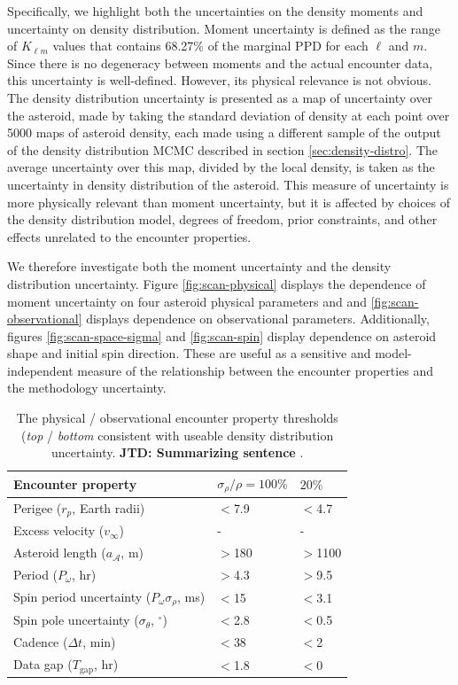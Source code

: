 \documentclass[fleqn,usenatbib]{mnras}
\newcommand{\jtd}[1]{ {\bf{\color{red} JTD: #1}} }
\begin{document}
Specifically, we highlight both the uncertainties on the density moments and uncertainty on density distribution. Moment uncertainty is defined as the range of $K_{\ell m}$ values that contains 68.27\% of the marginal PPD for each $\ell$ and $m$. Since there is no degeneracy between moments and the actual encounter data, this uncertainty is well-defined. However, its physical relevance is not obvious. The density distribution uncertainty is presented as a map of uncertainty over the asteroid, made by taking the standard deviation of density at each point over 5000 maps of asteroid density, each made using a different sample of the output of the density distribution MCMC described in section \ref{sec:density-distro}. The average uncertainty over this map, divided by the local density, is taken as the uncertainty in density distribution of the asteroid. This measure of uncertainty is more physically relevant than moment uncertainty, but it is affected by choices of the density distribution model, degrees of freedom, prior constraints, and other effects unrelated to the encounter properties.

We therefore investigate both the moment uncertainty and the density distribution uncertainty. Figure \ref{fig:scan-physical} displays the dependence of moment uncertainty on four asteroid physical parameters and and \ref{fig:scan-observational} displays dependence on observational parameters. Additionally, figures \ref{fig:scan-space-sigma} and \ref{fig:scan-spin} display dependence on asteroid shape and initial spin direction. These are useful as a sensitive and model-independent measure of the relationship between the encounter properties and the methodology uncertainty.


\begin{table}
  \centering
  \begin{tabular}{lll} \hline
    Encounter property & $\sigma_\rho / \rho = 100\%$ & $20\%$ \\ \hline
    Perigee ($r_p$, Earth radii) & $<$7.9 & $<$4.7 \\
    Excess velocity ($v_\infty$) & - & - \\
    Asteroid length ($a_\mathcal{A}$, m) & $>$180 & $>$1100 \\
    Period ($P_\omega$, hr) & $>$4.3 & $>$9.5\\ \hline
    Spin period uncertainty ($P_\omega \sigma_\rho$, ms) & $<$15 & $<$3.1\\
    Spin pole uncertainty ($\sigma_\theta$, $^\circ$) & $<$2.8 & $<$0.5 \\
    Cadence ($\Delta t$, min) & $<$38 & $<$2 \\
    Data gap ($T_\text{gap}$, hr) & $<$1.8 & $<$0 \\ 
    \hline
  \end{tabular}
  \caption{The physical / observational encounter property thresholds (\textit{top} / \textit{bottom} consistent with useable density distribution uncertainty. \jtd{Summarizing sentence}.}
  \label{tab:threshold-summary}
\end{table}
\end{document}
